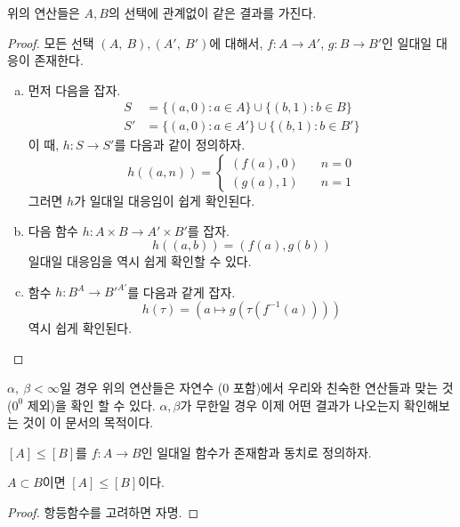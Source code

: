 \begin{theorem}
	위의 연산들은 $A, B$의 선택에 관계없이 같은 결과를 가진다.
\end{theorem}
\begin{proof}
	모든 선택 $(A,\: B), (A',\: B')$에 대해서, $f : A \to A'$, $g : B \to B'$인 일대일 대응이 존재한다.
	\begin{enumerate}[(a)]
		\item 먼저 다음을 잡자.
		\begin{align}
			S &= \{(a, 0) : a \in A\} \cup \{(b, 1) : b \in B\} \\
			S' &= \{(a, 0) : a \in A'\} \cup \{(b, 1) : b \in B'\}
		\end{align}
		이 때, $h : S \to S'$를 다음과 같이 정의하자.
		\begin{equation}
			h((a, n)) = \begin{cases}
				(f(a), 0) \quad &n = 0\\
				(g(a), 1) \quad &n = 1
			\end{cases}
		\end{equation}
		그러면 $h$가 일대일 대응임이 쉽게 확인된다.
		\item 다음 함수 $h: A \times B \to A' \times B'$를 잡자.
		\begin{equation}
			h((a, b)) = (f(a), g(b))
		\end{equation}
		일대일 대응임을 역시 쉽게 확인할 수 있다.
		\item 함수 $h: B^A \to {B'}^{A'}$를 다음과 같게 잡자.
		\begin{equation}
			h(\tau) = \left( a \mapsto g\left(\tau\left(f^{-1}(a)\right)\right) \right)
		\end{equation}
		역시 쉽게 확인된다.
	\end{enumerate}
\end{proof}
\begin{remark}
	$\alpha,\: \beta < \infty$일 경우 위의 연산들은 자연수 ($0$ 포함)에서 우리와 친숙한 연산들과 맞는 것 ($0^0$ 제외)을 확인 할 수 있다.
	$\alpha, \beta$가 무한일 경우 이제 어떤 결과가 나오는지 확인해보는 것이 이 문서의 목적이다.
\end{remark}
\begin{definition}
	$[A] \leq [B]$를 $f : A \to B$인 일대일 함수가 존재함과 동치로 정의하자.
\end{definition}
\begin{lemma}
	$A \subset B$이면 $[A] \leq [B]$이다.
\end{lemma}
\begin{proof}
	항등함수를 고려하면 자명.
\end{proof}
